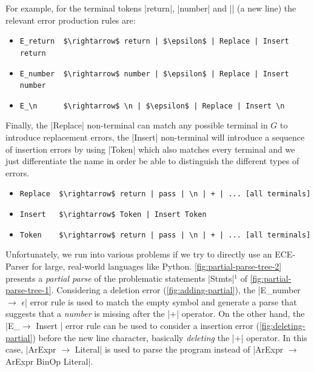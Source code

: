 For example, for the terminal tokens |return|, |number| and |\n| (a new line)
the relevant error production rules are:
\begin{itemize}
  \item \lstinline{E_return  $\rightarrow$ return | $\epsilon$ | Replace | Insert return}
  \item \lstinline{E_number  $\rightarrow$ number | $\epsilon$ | Replace | Insert number}
  \item \lstinline{E_\n      $\rightarrow$ \n | $\epsilon$ | Replace | Insert \n}
\end{itemize}
Finally, the |Replace| non-terminal can match any possible terminal in $G$ to
introduce replacement errors, the |Insert| non-terminal will introduce a
sequence of insertion errors by using |Token| which also matches every terminal
and we just differentiate the name in order be able to distinguish the different
types of errors.
\begin{itemize}
  \item \lstinline{Replace  $\rightarrow$ return | pass | \n | + | ... [all terminals]}
  \item \lstinline{Insert   $\rightarrow$ Token | Insert Token}
  \item \lstinline{Token    $\rightarrow$ return | pass | \n | + | ... [all terminals]}
\end{itemize}







%
Unfortunately, we run into various problems if we
try to directly use an ECE-Parser for large, real-world
languages like Python.
%
\autoref{fig:partial-parse-tree-2} presents a \emph{partial
parse} of the problematic statements |Stmts|$^1$ of
\autoref{fig:partial-parse-tree-1}.
%
Considering a deletion error (\autoref{fig:adding-partial}), the
%
|E_number $\rightarrow$ $\epsilon$| error rule is used to match the empty symbol
and generate a parse that suggests that a \emph{number} is missing after the |+|
operator. On the other hand, the
%
|E_\n $\rightarrow$ Insert \n| error rule can be used to consider a insertion
error (\autoref{fig:deleting-partial}) before the new line character, basically
\emph{deleting} the |+| operator. In this case, |ArExpr $\rightarrow$ Literal|
is used to parse the program instead of
%
|ArExpr $\rightarrow$ ArExpr BinOp Literal|.

